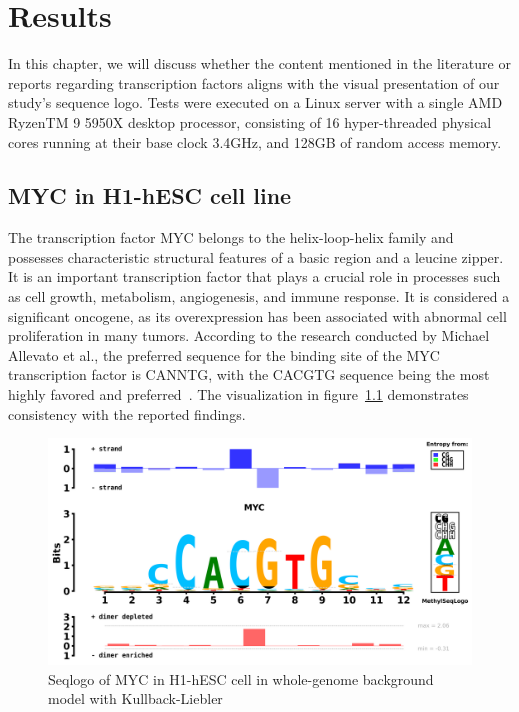 \documentclass{PHlab-thesis}
\begin{document}
\chapter{Results} 
In this chapter, we will discuss whether the content mentioned in the literature or reports regarding transcription factors aligns with the visual presentation of our study's sequence logo. Tests were executed on a Linux server with a single AMD RyzenTM 9 5950X desktop processor, consisting of 16 hyper-threaded physical cores running at their base clock 3.4GHz, and 128GB of random access memory.
\section{MYC in H1-hESC cell line}
The transcription factor MYC belongs to the helix-loop-helix family and possesses characteristic structural features of a basic region and a leucine zipper. It is an important transcription factor that plays a crucial role in processes such as cell growth, metabolism, angiogenesis, and immune response. It is considered a significant oncogene, as its overexpression has been associated with abnormal cell proliferation in many tumors. According to the research conducted by Michael Allevato et al., the preferred sequence for the binding site of the MYC transcription factor is CANNTG, with the CACGTG sequence being the most highly favored and preferred~\cite{allevato2017sequence}. The visualization in figure~\ref{fig:MYC} demonstrates consistency with the reported findings.
\begin{figure}[H]
	\centering	
	\includegraphics[scale=0.4]{figures/yulingMYC.png}
	\caption{Seqlogo of MYC in H1-hESC cell in whole-genome background model with Kullback-Liebler}
	\label{fig:MYC} 
\end{figure}
\end{document}
